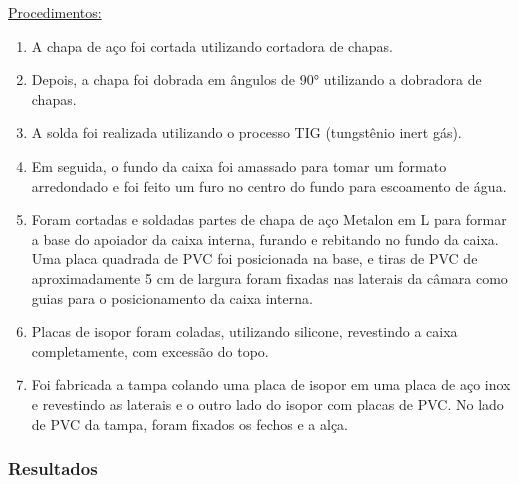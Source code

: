 \underline{Procedimentos:}

\begin{enumerate}
	\item A chapa de aço foi cortada utilizando cortadora de chapas.
	\item Depois, a chapa foi dobrada em ângulos de 90° utilizando a dobradora de chapas.
	\item A solda foi realizada utilizando o processo TIG (tungstênio inert gás).
	\item Em seguida, o fundo da caixa foi amassado para tomar um formato arredondado e foi feito um furo no centro do fundo para escoamento de água.
	\item Foram cortadas e soldadas partes de chapa de aço Metalon em L para formar a base do apoiador da caixa interna, furando e rebitando no fundo da caixa. Uma placa quadrada de PVC foi posicionada na base, e tiras de PVC de aproximadamente 5 cm de largura foram fixadas nas laterais da câmara como guias para o posicionamento da caixa interna.
	\item Placas de isopor foram coladas, utilizando silicone, revestindo a caixa completamente, com excessão do topo.
	\item Foi fabricada a tampa colando uma placa de isopor em uma placa de aço inox e revestindo as laterais e o outro lado do isopor com placas de PVC. No lado de PVC da tampa, foram fixados os fechos e a alça.
\end{enumerate}

\subsubsection{Resultados}

